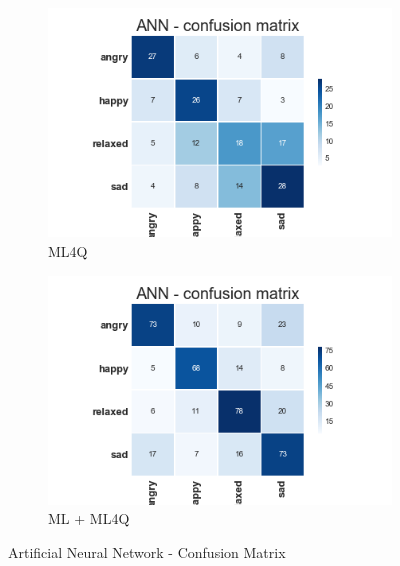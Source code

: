 \begin{figure}[H]
  \centering
  \begin{subfigure}[b]{0.49\linewidth}
    \includegraphics[width=\linewidth]{./chapters/chapter5/images/4Q/CM_ANN.png}
    \caption{ML4Q}
  \end{subfigure}
  \begin{subfigure}[b]{0.49\linewidth}
   \includegraphics[width=\linewidth]{./chapters/chapter5/images/join/CM_ANN.png}
    \caption{ML + ML4Q}
  \end{subfigure}
  \caption{Artificial Neural Network - Confusion Matrix}
  \label{fig:ann}
\end{figure}

